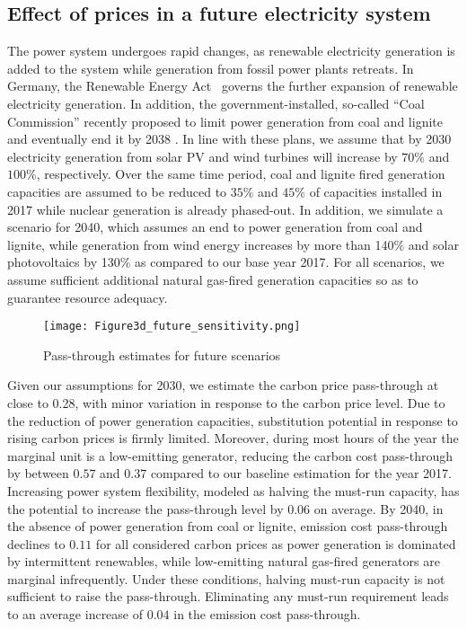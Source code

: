 \documentclass[preprint, 12pt, authoryear]{elsarticle}
\begin{document}
\subsection{Effect of  prices in a future electricity system}
The power system undergoes rapid changes, as renewable electricity generation is added to the system while generation from fossil power plants retreats. In Germany, the Renewable Energy Act~\citep{EEG2017} governs the further expansion of renewable electricity generation. In addition, the government-installed, so-called “Coal Commission” recently proposed to limit power generation from coal and lignite and eventually end it by 2038 \citep{KommissionWSB2019}.
In line with these plans, we assume that by 2030 electricity generation from solar PV and wind turbines will increase by $70\%$ and $100\%$, respectively. Over the same time period, coal and lignite fired generation capacities are assumed to be reduced to $35\%$ and $45\%$ of capacities installed in 2017 while nuclear generation is already phased-out. 
In addition, we simulate a scenario for 2040, which assumes an end to power generation from coal and lignite, while generation from wind energy increases by more than 140\% and solar photovoltaics by 130\% as compared to our base year 2017. 
For all scenarios, we assume sufficient additional natural gas-fired generation capacities so as to guarantee resource adequacy.
\begin{figure}[t]
\centering
\texttt{[image: Figure3d\_future\_sensitivity.png]}
\caption{Pass-through estimates for future scenarios}\label{Fig3c}
\end{figure}
 
Given our assumptions for 2030, we estimate the carbon price pass-through at close to 0.28, with minor variation in response to the carbon price level. Due to the reduction of power generation capacities, substitution potential in response to rising carbon prices is firmly limited. Moreover, during most hours of the year the marginal unit is a low-emitting generator, reducing the carbon cost pass-through by between $0.57$ and $0.37$ compared to our baseline estimation for the year 2017. Increasing power system flexibility, modeled as halving the must-run capacity, has the potential to increase the pass-through level by $0.06$ on average. 
By 2040, in the absence of power generation from coal or lignite, emission cost pass-through declines to $0.11$ for all considered carbon prices as power generation is dominated by intermittent renewables, while low-emitting natural gas-fired generators are marginal infrequently.
Under these conditions, halving must-run capacity is not sufficient to raise the pass-through. Eliminating any must-run requirement leads to an average increase of $0.04$ in the emission cost pass-through. 
\end{document}
